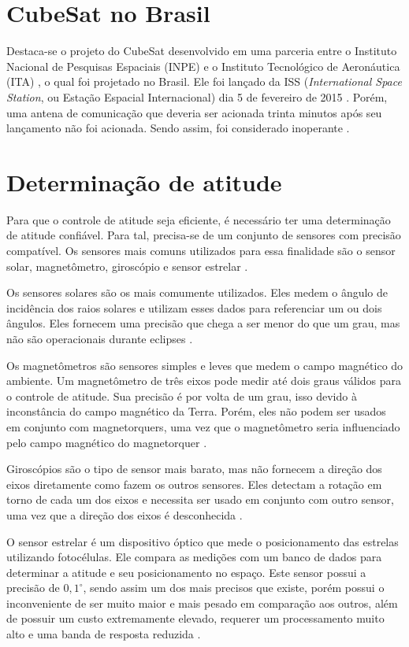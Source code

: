 \documentclass[
	12pt,				%
	openany,			%
	twoside,			%
	a4paper,			%
	english,			%
	french,				%
	spanish,			%
	brazil,				%
	oldfontcommands
	]{abntex2}
\begin{document}
\section{CubeSat no Brasil}

Destaca-se o projeto do CubeSat desenvolvido em uma parceria entre o Instituto Nacional de Pesquisas Espaciais (INPE) e o Instituto Tecnológico de Aeronáutica (ITA) \cite{AIT}, o qual foi projetado no Brasil. Ele foi lançado da ISS (\textit{International Space Station}, ou Estação Espacial Internacional) dia 5 de fevereiro de 2015 \cite{AEB}. Porém, uma antena de comunicação que deveria ser acionada trinta minutos após seu lançamento não foi acionada. Sendo assim, foi considerado inoperante \cite{ITA}.

\section{Determinação de atitude}

Para que o controle de atitude seja eficiente, é necessário ter uma determinação de atitude confiável. Para tal, precisa-se de um conjunto de sensores com precisão compatível. Os sensores mais comuns utilizados para essa finalidade são o sensor solar, magnetômetro, giroscópio e sensor estrelar \cite{FrancLav}.

Os sensores solares são os mais comumente utilizados. Eles medem o ângulo de incidência dos raios solares e utilizam esses dados para referenciar um ou dois ângulos. Eles fornecem uma precisão que chega a ser menor do que um grau, mas não são operacionais durante eclipses \cite{FrancLav}.

Os magnetômetros são sensores simples e leves que medem o campo magnético do ambiente. Um magnetômetro de três eixos pode medir até dois graus válidos para o controle de atitude. Sua precisão é por volta de um grau, isso devido à inconstância do campo magnético da Terra. Porém, eles não podem ser usados em conjunto com magnetorquers, uma vez que o magnetômetro seria influenciado pelo campo magnético do magnetorquer \cite{FrancLav}.

Giroscópios são o tipo de sensor mais barato, mas não fornecem a direção dos eixos diretamente como fazem os outros sensores. Eles detectam a rotação em torno de cada um dos eixos e necessita ser usado em conjunto com outro sensor, uma vez que a direção dos eixos é desconhecida \cite{FrancLav}.

O sensor estrelar é um dispositivo óptico que mede o posicionamento das estrelas utilizando fotocélulas. Ele compara as medições com um banco de dados para determinar a atitude e seu posicionamento no espaço. Este sensor possui a precisão de $0,1^{\circ}$, sendo assim um dos mais precisos que existe, porém possui o inconveniente de ser muito maior e mais pesado em comparação aos outros, além de possuir um custo extremamente elevado, requerer um processamento muito alto e uma banda de resposta reduzida \cite{FrancLav}.
\end{document}
